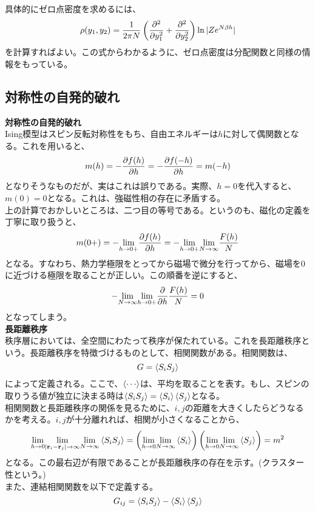 \documentclass[a4paper,11pt]{jsarticle}
\numberwithin{equation}{section}
\begin{document}
具体的にゼロ点密度を求めるには、
\begin{equation}
    \rho(y_1,y_2) = \frac{1}{2\pi N}\left(\pdv[2]{y_1} + \pdv[2]{y_2}\right)\ln |Ze^{N\beta h}|
\end{equation}
を計算すればよい。この式からわかるように、ゼロ点密度は分配関数と同様の情報をもっている。\\

\subsection{対称性の自発的破れ}
\textbf{対称性の自発的破れ}\\
Ising模型はスピン反転対称性をもち、自由エネルギーは$h$に対して偶関数となる。これを用いると、
\begin{equation}
    m(h) =-\pdv{f(h)}{h} = -\pdv{f(-h)}{h} = m(-h)
\end{equation}
となりそうなものだが、実はこれは誤りである。実際、$h=0$を代入すると、$m(0) = 0$となる。これは、強磁性相の存在に矛盾する。\\
上の計算でおかしいところは、二つ目の等号である。というのも、磁化の定義を丁寧に取り扱うと、
\begin{equation}
    m(0+) = -\underset{h\to 0+}{\lim}\pdv{f(h)}{h} = -\underset{h\to 0+}{\lim} \underset{N \to \infty}{\lim}\frac{F(h)}{N}
\end{equation}
となる。すなわち、熱力学極限をとってから磁場で微分を行ってから、磁場を$0$に近づける極限を取ることが正しい。この順番を逆にすると、
\begin{equation}
    -\underset{N \to \infty}{\lim}\underset{h \to 0+}{\lim}\pdv{h} \frac{F(h)}{N} =0
\end{equation}
となってしまう。\\

\textbf{長距離秩序}\\
秩序層においては、全空間にわたって秩序が保たれている。これを長距離秩序という。長距離秩序を特徴づけるものとして、相関関数がある。相関関数は、
\begin{equation}
    G = \expval{S_iS_j} 
\end{equation}
によって定義される。ここで、$\expval{\cdots}$は、平均を取ることを表す。もし、スピンの取りうる値が独立に決まる時は$\expval{S_iS_j} = \expval{S_i}\expval{S_j}$となる。\\
相関関数と長距離秩序の関係を見るために、$i,j$の距離を大きくしたらどうなるかを考える。$i,j$が十分離れれば、相関が小さくなることから、
\begin{equation}
    \underset{h \to 0}{\lim} \underset{|\vb{r}_i - \vb{r}_j| \to \infty}{\lim} \underset{N \to \infty}{\lim} \expval{S_iS_j} = \left(\underset{h \to 0}{\lim} \underset{N \to \infty}{\lim} \expval{S_i}\right) \left(\underset{h \to 0}{\lim} \underset{N \to \infty}{\lim} \expval{S_j}\right) =m^2
\end{equation}
となる。この最右辺が有限であることが長距離秩序の存在を示す。(クラスター性という。)\\
また、連結相関関数を以下で定義する。
\begin{equation}
    G_{ij} = \expval{S_iS_j} - \expval{S_i}\expval{S_j}
\end{equation}
\end{document}
